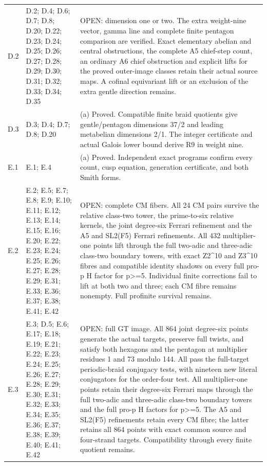 \begin{longtable}{@{}p{1.1cm}p{3.0cm}p{10.3cm}@{}}
D.2 & D.2; D.4; D.6; D.7; D.8; D.20; D.22; D.23; D.24; D.25; D.26; D.27; D.28; D.29; D.30; D.31; D.32; D.33; D.34; D.35 & OPEN: dimension one or two. The extra weight-nine vector, gamma line and complete finite pentagon comparison are verified. Exact elementary abelian and central obstructions, the complete A5 chief-step count, an ordinary A6 chief obstruction and explicit lifts for the proved outer-image classes retain their actual source maps. A cofinal equivariant lift or an exclusion of the extra gentle direction remains. \\
D.3 & D.3; D.4; D.7; D.8; D.20 & (a) Proved. Compatible finite braid quotients give gentle/pentagon dimensions 37/2 and leading metabelian dimensions 2/1. The integer certificate and actual Galois lower bound derive R9 in weight nine. \\
E.1 & E.1; E.4 & (a) Proved. Independent exact programs confirm every count, cusp equation, generation certificate, and both Smith forms. \\
E.2 & E.2; E.5; E.7; E.8; E.9; E.10; E.11; E.12; E.13; E.14; E.15; E.16; E.20; E.22; E.23; E.24; E.25; E.26; E.27; E.28; E.29; E.31; E.33; E.36; E.37; E.38; E.41; E.42 & OPEN: complete CM fibers. All 24 CM pairs survive the relative class-two tower, the prime-to-six relative kernels, the joint degree-six Ferrari refinement and the A5 and SL2(F5) Ferrari refinements. All 432 multiplier-one points lift through the full two-adic and three-adic class-two boundary towers, with exact Z2\textasciicircum{}10 and Z3\textasciicircum{}10 fibres and compatible identity shadows on every full pro-p H factor for p>=5. Individual finite corrections fail to lift at both two and three; each CM fibre remains nonempty. Full profinite survival remains. \\
E.3 & E.3; D.5; E.6; E.17; E.18; E.19; E.21; E.22; E.23; E.24; E.25; E.26; E.27; E.28; E.29; E.30; E.31; E.32; E.33; E.34; E.35; E.36; E.37; E.38; E.39; E.40; E.41; E.42 & OPEN: full GT image. All 864 joint degree-six points generate the actual targets, preserve full twists, and satisfy both hexagons and the pentagon at multiplier residues 1 and 73 modulo 144. All pass the full-target periodic-braid conjugacy tests, with nineteen new literal conjugators for the order-four test. All multiplier-one points retain their degree-six Ferrari maps through the full two-adic and three-adic class-two boundary towers and the full pro-p H factors for p>=5. The A5 and SL2(F5) refinements retain every CM fibre; the latter retains all 864 points with exact common source and four-strand targets. Compatibility through every finite quotient remains. \\

\end{longtable}
